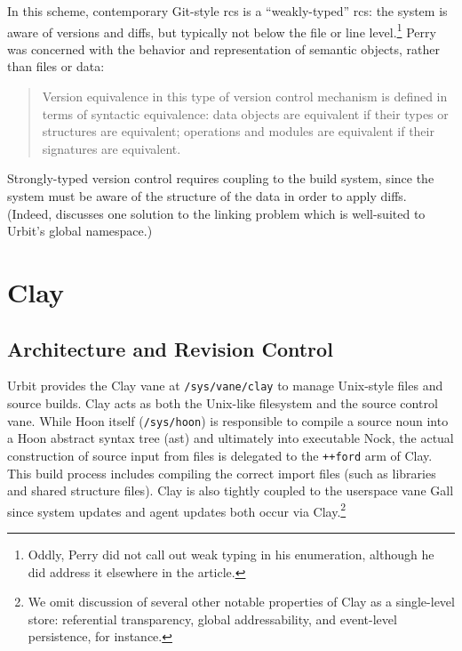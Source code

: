 \documentclass[twoside]{article}
\begin{document}
\noindent
In this scheme, contemporary Git-style {\sc rcs} is a ``weakly-typed'' {\sc rcs}:  the system is aware of versions and diffs, but typically not below the file or line level.\footnote{Oddly, Perry did not call out weak typing in his enumeration, although he did address it elsewhere in the article.}  Perry was concerned with the behavior and representation of semantic objects, rather than files or data:

\begin{quote}
  Version equivalence in this type of version control mechanism is defined in terms of syntactic equivalence:  data objects are equivalent if their types or structures are equivalent; operations and modules are equivalent if their signatures are equivalent.  \citep{Perry1987}
\end{quote}

\noindent
Strongly-typed version control requires coupling to the build system, since the system must be aware of the structure of the data in order to apply diffs.  (Indeed, \citet{Blackman2024} discusses one solution to the linking problem which is well-suited to Urbit's global namespace.)


\section{Clay}

\subsection{Architecture and Revision Control}

Urbit provides the Clay vane at \lstinline[style=inlinecode]{/sys/vane/clay} to manage Unix-style files and source builds.  Clay acts as both the Unix-like filesystem and the source control vane.  While Hoon itself (\lstinline[style=inlinecode]{/sys/hoon}) is responsible to compile a source noun into a Hoon abstract syntax tree ({\sc ast}) and ultimately into executable Nock, the actual construction of source input from files is delegated to the \lstinline[style=inlinecode]{++ford} arm of Clay.  This build process includes compiling the correct import files (such as libraries and shared structure files).  Clay is also tightly coupled to the userspace vane Gall since system updates and agent updates both occur via Clay.\footnote{We omit discussion of several other notable properties of Clay as a single-level store:  referential transparency, global addressability, and event-level persistence, for instance.}
\end{document}
